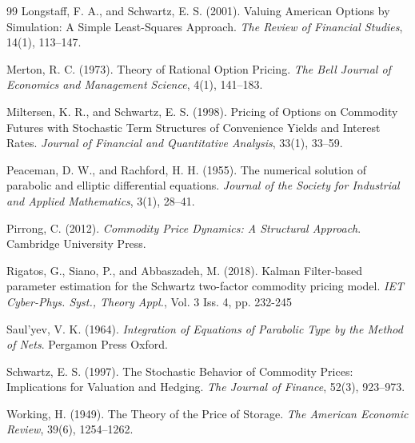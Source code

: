 \documentclass[12pt,a4paper]{article}
\begin{document}
\begin{thebibliography}{99}
 Longstaff, F. A., and Schwartz, E. S. (2001). Valuing American Options by Simulation: A Simple Least-Squares Approach. \textit{The Review of Financial Studies}, 14(1), 113--147.

 Merton, R. C. (1973). Theory of Rational Option Pricing. \textit{The Bell Journal of Economics and Management Science}, 4(1), 141--183.


 Miltersen, K. R., and Schwartz, E. S. (1998). Pricing of Options on Commodity Futures with Stochastic Term Structures of Convenience Yields and Interest Rates. \textit{Journal of Financial and Quantitative Analysis}, 33(1), 33--59.

 Peaceman, D. W., and Rachford, H. H. (1955). The numerical solution of parabolic and elliptic differential equations. \textit{Journal of the Society for Industrial and Applied Mathematics}, 3(1), 28--41.

 Pirrong, C. (2012). \textit{Commodity Price Dynamics: A Structural Approach}. Cambridge University Press.

 Rigatos, G., Siano, P., and Abbaszadeh, M. (2018). Kalman Filter-based parameter estimation for the Schwartz two-factor commodity pricing model. \textit{IET Cyber-Phys. Syst., Theory Appl.}, Vol. 3 Iss. 4, pp. 232-245

 Saul'yev, V. K. (1964). \textit{Integration of Equations of Parabolic Type by the Method of Nets}. Pergamon Press Oxford.

 Schwartz, E. S. (1997). The Stochastic Behavior of Commodity Prices: Implications for Valuation and Hedging. \textit{The Journal of Finance}, 52(3), 923--973.

 Working, H. (1949). The Theory of the Price of Storage. \textit{The American Economic Review}, 39(6), 1254--1262.

\end{thebibliography}
\end{document}
